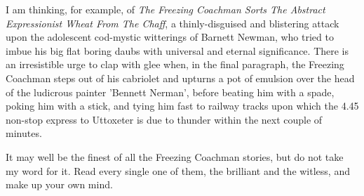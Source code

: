 I am thinking, for example, of \emph{The Freezing Coachman Sorts The Abstract Expressionist Wheat From The Chaff}, a thinly-disguised and blistering attack upon the adolescent cod-mystic witterings of Barnett Newman, who tried to imbue his big flat boring daubs with universal and eternal significance. There is an irresistible urge to clap with glee when, in the final paragraph, the Freezing Coachman steps out of his cabriolet and upturns a pot of emulsion over the head of the ludicrous painter 'Bennett Nerman', before beating him with a spade, poking him with a stick, and tying him fast to railway tracks upon which the 4.45 non-stop express to Uttoxeter is due to thunder within the next couple of minutes.

It may well be the finest of all the Freezing Coachman stories, but do not take my word for it. Read every single one of them, the brilliant and the witless, and make up your own mind.